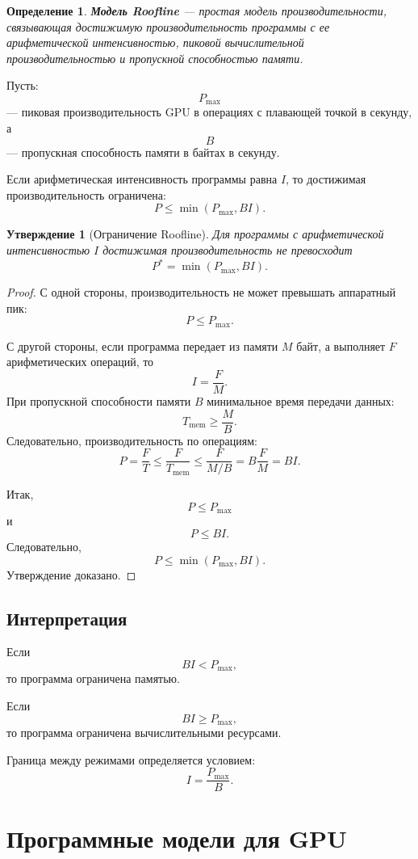 \documentclass[12pt,a4paper]{article}
\newtheorem{definition}{Определение}
\newtheorem{proposition}{Утверждение}
\begin{document}
\begin{definition}
\textbf{Модель Roofline} --- простая модель производительности, связывающая достижимую производительность программы с ее арифметической интенсивностью, пиковой вычислительной производительностью и пропускной способностью памяти.
\end{definition}

Пусть:
\[
    P_{\max}
\]
--- пиковая производительность GPU в операциях с плавающей точкой в секунду, а
\[
    B
\]
--- пропускная способность памяти в байтах в секунду.

Если арифметическая интенсивность программы равна $I$, то достижимая производительность ограничена:
\[
    P \le \min(P_{\max}, BI).
\]

\begin{proposition}[Ограничение Roofline]
Для программы с арифметической интенсивностью $I$ достижимая производительность не превосходит
\[
    P^* = \min(P_{\max}, BI).
\]
\end{proposition}

\begin{proof}
С одной стороны, производительность не может превышать аппаратный пик:
\[
    P \le P_{\max}.
\]

С другой стороны, если программа передает из памяти $M$ байт, а выполняет $F$ арифметических операций, то
\[
    I = \frac{F}{M}.
\]
При пропускной способности памяти $B$ минимальное время передачи данных:
\[
    T_{\text{mem}} \ge \frac{M}{B}.
\]
Следовательно, производительность по операциям:
\[
    P = \frac{F}{T} \le \frac{F}{T_{\text{mem}}}
      \le \frac{F}{M/B}
      = B\frac{F}{M}
      = BI.
\]

Итак,
\[
    P \le P_{\max}
\]
и
\[
    P \le BI.
\]
Следовательно,
\[
    P \le \min(P_{\max}, BI).
\]
Утверждение доказано.
\end{proof}

\subsection{Интерпретация}

Если
\[
    BI < P_{\max},
\]
то программа ограничена памятью.

Если
\[
    BI \ge P_{\max},
\]
то программа ограничена вычислительными ресурсами.

Граница между режимами определяется условием:
\[
    I = \frac{P_{\max}}{B}.
\]

\section{Программные модели для GPU}
\end{document}
